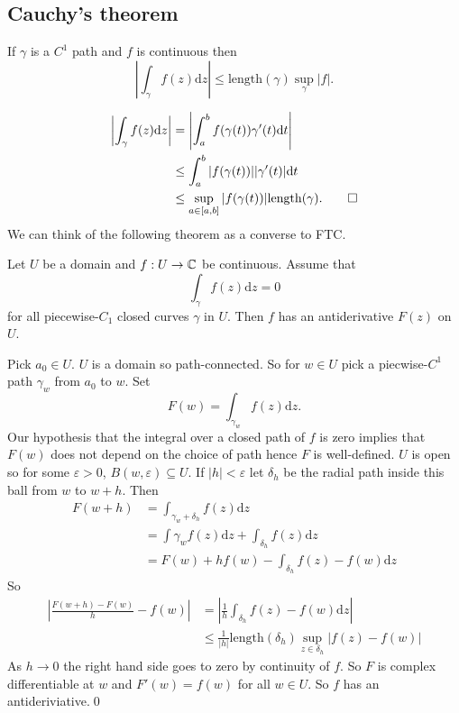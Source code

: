 \documentclass{article}
\begin{document}
\subsection{Cauchy's theorem}
\begin{lemma}
  If $ \gamma $ is a $ C^1 $ path and $ f $ is continuous then
  \[
	  \left|\int_\gamma f(z)\mathrm dz\right|\le \mathrm{length}(\gamma)\sup_\gamma|f|.
  \]
\end{lemma}
\pf
\begin{align*}
	\left|\int_\gamma f(z)\mathrm dz\right| &= \left|\int_a^b f(\gamma(t))\gamma'(t)\mathrm dt\right|\\
						&\le \int_a^b |f(\gamma(t))||\gamma'(t)|\mathrm dt\\
						&\le \sup_{a\in [a,b]} |f(\gamma(t))|\mathrm{length}(\gamma).\qed
\end{align*}
We can think of the following theorem as a converse to FTC.
\begin{theorem}
  Let $ U $ be a domain and $ f:U\to \mathbb{C} $ be continuous. Assume that
  \[
    \int_\gamma f(z)\mathrm dz = 0
  \]
  for all piecewise-$ C_1 $ closed curves $ \gamma $ in $ U $. Then $ f $ has an antiderivative $ F(z) $ on $ U $.
\end{theorem}
\pf Pick $ a_0\in U $. $ U $ is a domain so path-connected. So for $ w\in U $ pick a piecwise-$ C^1 $ path $ \gamma_w $ from $ a_0 $ to $ w $. Set
\[
	F(w)=\int_{\gamma_w}f(z)\mathrm dz.
\]
Our hypothesis that the integral over a closed path of $ f $ is zero implies that $ F(w) $ does not depend on the choice of path hence $ F $ is well-defined. $ U $ is open so for some $ \varepsilon>0 $, $ B(w,\varepsilon)\subseteq U $. If $ |h|<\varepsilon $ let $ \delta_h $ be the radial path inside this ball from $ w $ to $ w+h $. Then
\begin{align*}
	F(w+h) &= \int_{\gamma_w + \delta_h} f(z)\mathrm dz\\
	       &= \int { \gamma_w} f(z)\mathrm dz + \int_{\delta_h}f(z)\mathrm dz\\
	       &= F(w) + hf(w) - \int_{\delta_h}f(z)-f(w)\mathrm dz
\end{align*}
So
\begin{align*}
	\left|\frac{F(w+h)-F(w)}h -f(w)\right| &= \left|\frac 1h \int_{\delta_h} f(z)-f(w)\mathrm dz\right|\\
					       &\le \frac 1{|h|}\mathrm{length}(\delta_h)\sup_{z\in \delta_h}|f(z)-f(w)|
\end{align*}
As $ h\to 0 $ the right hand side goes to zero by continuity of $ f $. So $ F $ is complex differentiable at $ w $ and $ F'(w)=f(w) $ for all $ w\in U $. So $ f $ has an antideriviative.\qed
\end{document}
